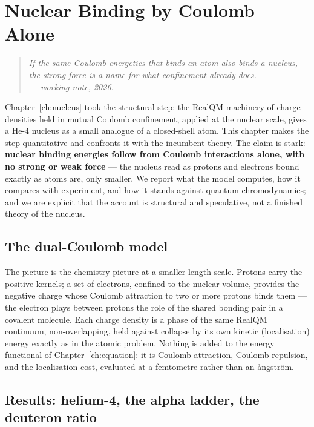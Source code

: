 \chapter{Nuclear Binding by Coulomb Alone}\label{ch:nuclear-binding}

\begin{quote}
\itshape If the same Coulomb energetics that binds an atom also binds a nucleus, the strong force is a name for
what confinement already does.\\
\normalfont\hfill --- working note, 2026.
\end{quote}
\bigskip

Chapter~\ref{ch:nucleus} took the structural step: the RealQM machinery of charge densities held in mutual
Coulomb confinement, applied at the nuclear scale, gives a He-4 nucleus as a small analogue of a closed-shell
atom. This chapter makes the step quantitative and confronts it with the incumbent theory. The claim is stark:
\textbf{nuclear binding energies follow from Coulomb interactions alone, with no strong or weak force} --- the
nucleus read as protons and electrons bound exactly as atoms are, only smaller. We report what the model
computes, how it compares with experiment, and how it stands against quantum chromodynamics; and we are explicit
that the account is structural and speculative, not a finished theory of the nucleus.

\section{The dual-Coulomb model}\label{sec:dual-coulomb}

The picture is the chemistry picture at a smaller length scale. Protons carry the positive kernels; a set of
electrons, confined to the nuclear volume, provides the negative charge whose Coulomb attraction to two or more
protons binds them --- the electron plays between protons the role of the shared bonding pair in a covalent
molecule. Each charge density is a phase of the same RealQM continuum, non-overlapping, held against collapse by
its own kinetic (localisation) energy exactly as in the atomic problem. Nothing is added to the energy functional
of Chapter~\ref{ch:equation}: it is Coulomb attraction, Coulomb repulsion, and the localisation cost, evaluated
at a femtometre rather than an \aa ngstr\"om.

\section{Results: helium-4, the alpha ladder, the deuteron ratio}\label{sec:nuc-results}

